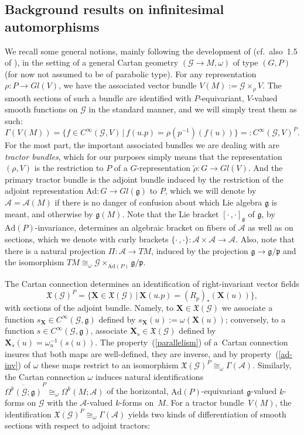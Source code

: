 \documentclass[11pt]{article}
\def\g{\mathfrak{g}}
\def\p{\mathfrak{p}}
\def\Abdle{\mathcal{A}}
\def\Gbdle{\mathcal{G}}
\def\VF{\mathfrak{X}}
\def\isom{\cong}
\theoremstyle{plain}
\theoremstyle{definition}
\begin{document}
\subsection{Background results on inf\/initesimal automorphisms}\label{section4.1}

We recall some general notions, mainly following the development of \cite{Cap inf aut} (cf.\ also~1.5 of \cite{CSbook}), in the setting of a general Cartan geometry $(\Gbdle \rightarrow M,\omega)$ of type $(G,P)$ (for now not assumed to be of parabolic type). For any representation $\rho: P \rightarrow Gl(V)$, we have the associated vector bundle $V(M) := \Gbdle \times_{\rho} V$. The smooth sections of such a bundle are identif\/ied with $P$-equivariant, $V$-valued smooth functions on $\Gbdle$ in the standard manner, and we will simply treat them as such:
\[
\Gamma(V(M)) = \big\{f \in C^{\infty}(\Gbdle,V) \, \vert \, f(u.p) = \rho(p^{-1})(f(u))\big\} =: C^{\infty}(\Gbdle,V)^P.
\]
For the most part, the important associated bundles we are dealing with are \emph{tractor bundles}, which for our purposes simply means that the representation $(\rho,V)$ is the restriction to $P$ of a $G$-representation $\tilde{\rho}:G \rightarrow Gl(V)$. And the primary tractor bundle is the adjoint bundle induced by the restriction of the adjoint representation $\mathrm{Ad}: G \rightarrow Gl(\g)$ to $P$, which we will denote by $\Abdle = \Abdle(M)$ if there is no danger of confusion about which Lie algebra $\g$ is meant, and otherwise by $\g(M)$. Note that the Lie bracket $[\cdot \, ,\cdot]_{\g}$ of $\g$, by $\mathrm{Ad}(P)$-invariance, determines an algebraic bracket on f\/ibers of $\Abdle$ as well as on sections, which we denote with curly brackets $\{\cdot \, ,\cdot\}: \Abdle \times \Abdle \rightarrow \Abdle$. Also, note that there is a natural projection $\Pi: \Abdle \rightarrow TM$, induced by the projection $\g \rightarrow \g/\p$ and the isomorphism $TM \isom_{\omega} \Gbdle \times_{\overline{\mathrm{Ad}}(P)} \g/\p$.

The Cartan connection determines an identif\/ication of right-invariant vector f\/ields
\[
\VF(\Gbdle)^P = \{ \mathbf{X} \in \VF(\Gbdle) \, \vert \, \mathbf{X}(u.p) = (R_p)_* (\mathbf{X}(u))\},
\]
with sections of the adjoint bundle. Namely, to $\mathbf{X} \in \VF(\Gbdle)$ we associate a function $s_{\mathbf{X}} \in C^{\infty}(\Gbdle,\g)$ def\/ined by $s_{\mathbf{X}}(u) := \omega(\mathbf{X}(u))$; conversely, to a function $s \in C^{\infty}(\Gbdle,\g)$, associate $\mathbf{X}_s \in \VF(\Gbdle)$ def\/ined by $\mathbf{X}_s(u) = \omega_u^{-1}(s(u))$. The property~(\ref{parallelism}) of a~Cartan connection insures that both maps are well-def\/ined, they are inverse, and by property~(\ref{ad-inv}) of $\omega$ these maps restrict to an isomorphism $\VF(\Gbdle)^P \isom_{\omega} \Gamma(\Abdle)$. Similarly, the Cartan connection $\omega$ induces natural identif\/ications $\overline{\Omega^k(\Gbdle;\g)}^P \isom_{\omega} \Omega^k(M;\Abdle)$ of the horizontal, $\mathrm{Ad}(P)$-equivariant $\g$-valued $k$-forms on $\Gbdle$ with the $\Abdle$-valued $k$-forms on~$M$. For a tractor bundle~$V(M)$, the identif\/ication $\VF(\Gbdle)^P \isom_{\omega} \Gamma(\Abdle)$ yields two kinds of dif\/ferentiation of smooth sections with respect to adjoint tractors:
\end{document}

